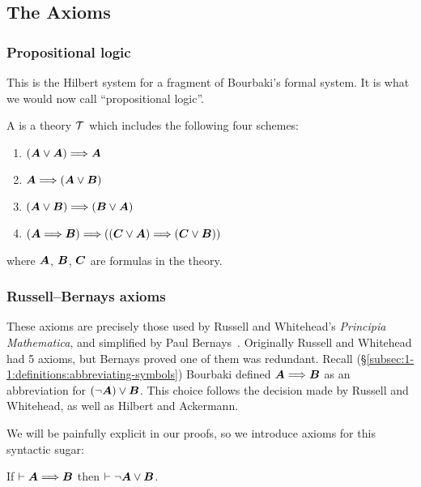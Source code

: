 \subsection{The Axioms}
\setcounter{subsubsection}{-1}
\subsubsection{Propositional logic} This is the Hilbert system for
a fragment of Bourbaki's formal system. It is what we would now call
``propositional logic''.

\begin{definition}
A  is a theory $\mathcal{T}$ which includes the
following four schemes:
\begin{enumerate}[label=(S\arabic*),ref={S\arabic*}]
\item\label{axiom:s1} $(\boldsymbol{A}\lor\boldsymbol{A})\Longrightarrow\boldsymbol{A}$
\item\label{axiom:s2} $\boldsymbol{A}\Longrightarrow(\boldsymbol{A}\lor\boldsymbol{B})$
\item\label{axiom:s3} $(\boldsymbol{A}\lor\boldsymbol{B})\Longrightarrow(\boldsymbol{B}\lor\boldsymbol{A})$
\item\label{axiom:s4} $(\boldsymbol{A}\Longrightarrow\boldsymbol{B})\Longrightarrow((\boldsymbol{C}\lor\boldsymbol{A})\Longrightarrow(\boldsymbol{C}\lor\boldsymbol{B}))$
\end{enumerate}
where $\boldsymbol{A}$, $\boldsymbol{B}$, $\boldsymbol{C}$
are formulas in the theory.
\end{definition}

\subsubsection{Russell--Bernays axioms}
These axioms are precisely those used by Russell and Whitehead's
\textit{Principia Mathematica}, and simplified by Paul
Bernays~\cite{bernays1926}. Originally Russell and Whitehead had 5
axioms, but Bernays proved one of them was redundant.
Recall (\S\ref{subsec:1-1:definitions:abbreviating-symbols})
Bourbaki defined $\boldsymbol{A}\Longrightarrow\boldsymbol{B}$ as an
abbreviation for $(\neg\boldsymbol{A})\lor\boldsymbol{B}$. This
choice follows the decision made by Russell and Whitehead, as well as
Hilbert and Ackermann.

We will be painfully explicit in our proofs, so we introduce axioms for
this syntactic sugar:
\begin{syn}\label{unfold-implies}%
If $\vdash\boldsymbol{A}\Longrightarrow\boldsymbol{B}$
then $\vdash\neg\boldsymbol{A}\lor\boldsymbol{B}$.
\end{syn}

